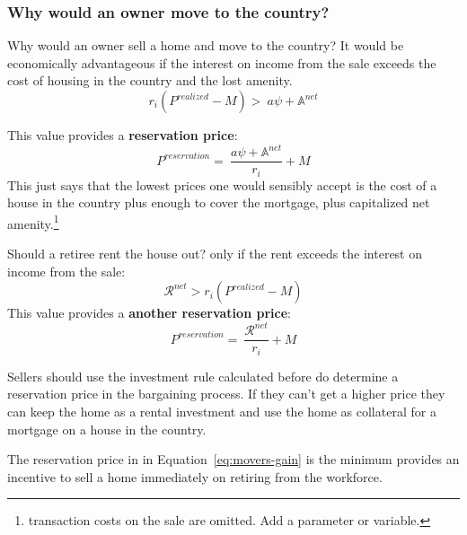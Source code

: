 \subsubsection{Why would an owner move to the country?}
Why would an owner sell a home and move to the country? It would be economically advantageous if the interest on income from the sale exceeds the cost of housing in the country and the lost amenity.
\[r_i(P^{realized}-M) >\ a\psi+ \mathbb{A}^{net}\label{eq:movers-gainA}\]


This value provides a \textbf{reservation price}: 
\[P^{reservation} =\ \frac{a\psi+ \mathbb{A}^{net}}{r_i}+M \label{eq:movers-gainB}\]
This just says that the lowest prices one would sensibly accept is the cost of a house in the country plus enough to cover the mortgage, plus capitalized net amenity.\footnote{transaction costs on the sale are omitted. Add a parameter or variable.}

Should a retiree rent the house out? only if the rent exceeds the  interest on income from the sale:
\[\mathcal{R}^{net}>r_i(P^{realized}-M)\]
This value provides a \textbf{another reservation price}: 
\[P^{reservation} =\ \frac{\mathcal{R}^{net}}{r_i}+M \label{eq:movers-gainC}\]


Sellers should use the investment rule calculated before  do determine a  reservation price in the bargaining process. If they can't get a higher price they  can keep the home as a rental  investment and use the home as collateral for a mortgage on a house in the country.

The reservation price in in Equation~\ref {eq:movers-gain} is the minimum provides an incentive to sell a home immediately on retiring from the workforce. 



